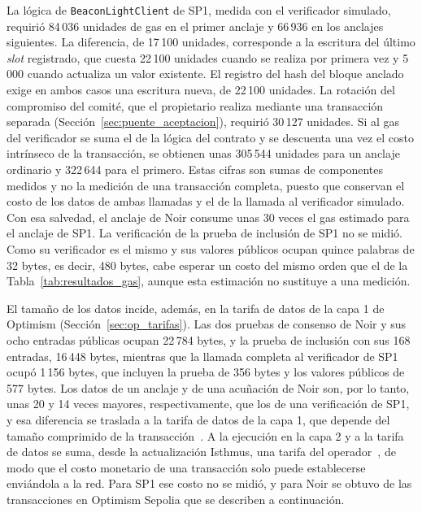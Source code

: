 La lógica de \texttt{BeaconLightClient} de SP1, medida con el verificador simulado, requirió
84\,036 unidades de gas en el primer anclaje y 66\,936 en los anclajes siguientes. La diferencia,
de 17\,100 unidades, corresponde a la escritura del último \textit{slot} registrado, que cuesta
22\,100 unidades cuando se realiza por primera vez y 5\,000 cuando actualiza un valor existente.
El registro del hash del bloque anclado exige en ambos casos una escritura nueva, de 22\,100
unidades. La rotación del compromiso del comité, que el propietario realiza mediante una
transacción separada (Sección~\ref{sec:puente_aceptacion}), requirió 30\,127 unidades. Si al gas
del verificador se suma el de la lógica del contrato y se descuenta una vez el costo intrínseco de
la transacción, se obtienen unas 305\,544 unidades para un anclaje ordinario y 322\,644 para el
primero. Estas cifras son sumas de componentes medidos y no la medición de una transacción
completa, puesto que conservan el costo de los datos de ambas llamadas y el de la llamada al
verificador simulado. Con esa salvedad, el anclaje de Noir consume unas 30 veces el gas estimado
para el anclaje de SP1. La verificación de la prueba de inclusión de SP1 no se midió. Como su
verificador es el mismo y sus valores públicos ocupan quince palabras de 32 bytes, es decir,
480 bytes, cabe esperar un costo del mismo orden que el de la Tabla~\ref{tab:resultados_gas},
aunque esta estimación no sustituye a una medición.

El tamaño de los datos incide, además, en la tarifa de datos de la capa 1 de Optimism
(Sección~\ref{sec:op_tarifas}). Las dos pruebas de consenso de Noir y sus ocho entradas públicas
ocupan 22\,784 bytes, y la prueba de inclusión con sus 168 entradas, 16\,448 bytes, mientras que la
llamada completa al verificador de SP1 ocupó 1\,156 bytes, que incluyen la prueba de 356 bytes y
los valores públicos de 577 bytes. Los datos de un anclaje y de una acuñación de Noir son, por lo
tanto, unas 20 y 14 veces mayores, respectivamente, que los de una verificación de SP1, y esa
diferencia se traslada a la tarifa de datos de la capa 1, que depende del tamaño comprimido de la
transacción~\cite{opfees}. A la ejecución en la capa 2 y a la tarifa de datos se suma, desde la
actualización Isthmus, una tarifa del operador~\cite{opfees}, de modo que el costo monetario de una
transacción solo puede establecerse enviándola a la red. Para SP1 ese costo no se midió, y para Noir
se obtuvo de las transacciones en Optimism Sepolia que se describen a continuación.

